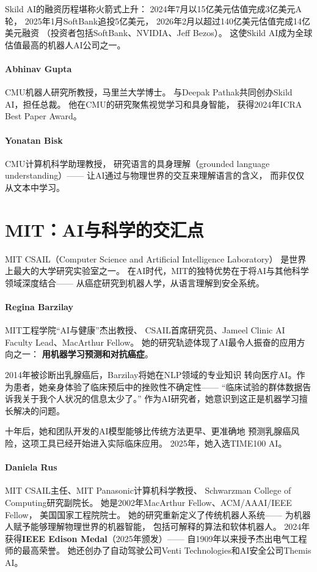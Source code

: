 Skild AI的融资历程堪称火箭式上升：
2024年7月以15亿美元估值完成3亿美元A轮，
2025年1月SoftBank追投5亿美元，
2026年2月以超过140亿美元估值完成14亿美元融资
（投资者包括SoftBank、NVIDIA、Jeff Bezos）。
这使Skild AI成为全球估值最高的机器人AI公司之一。

\paragraph{Abhinav Gupta}
CMU机器人研究所教授，马里兰大学博士。
与Deepak Pathak共同创办Skild AI，担任总裁。
他在CMU的研究聚焦视觉学习和具身智能，
获得2024年ICRA Best Paper Award。

\paragraph{Yonatan Bisk}
CMU计算机科学助理教授，
研究语言的具身理解（grounded language understanding）——
让AI通过与物理世界的交互来理解语言的含义，
而非仅仅从文本中学习。


\section{MIT：AI与科学的交汇点}
\label{sec:mit}

MIT CSAIL（Computer Science and Artificial Intelligence Laboratory）
是世界上最大的大学研究实验室之一。
在AI时代，MIT的独特优势在于将AI与其他科学领域深度结合——
从癌症研究到机器人学，从语言理解到安全系统。

\paragraph{Regina Barzilay}
MIT工程学院``AI与健康''杰出教授、
CSAIL首席研究员、Jameel Clinic AI Faculty Lead、MacArthur Fellow。
她的研究轨迹体现了AI最令人振奋的应用方向之一：
\textbf{用机器学习预测和对抗癌症}。

2014年被诊断出乳腺癌后，Barzilay将她在NLP领域的专业知识
转向医疗AI。作为患者，她亲身体验了临床预后中的挫败性不确定性——
``临床试验的群体数据告诉我关于我个人状况的信息太少了。''
作为AI研究者，她意识到这正是机器学习擅长解决的问题。

十年后，她和团队开发的AI模型能够比传统方法更早、更准确地
预测乳腺癌风险，这项工具已经开始进入实际临床应用。
2025年，她入选TIME100 AI。

\paragraph{Daniela Rus}
MIT CSAIL主任、MIT Panasonic计算机科学教授、
Schwarzman College of Computing研究副院长。
她是2002年MacArthur Fellow、ACM/AAAI/IEEE Fellow，
美国国家工程院院士。
她的研究重新定义了传统机器人系统——
为机器人赋予能够理解物理世界的机器智能，
包括可解释的算法和软体机器人。
2024年获得\textbf{IEEE Edison Medal}（2025年颁发）——
自1909年以来授予杰出电气工程师的最高荣誉。
她还创办了自动驾驶公司Venti Technologies和AI安全公司Themis AI。

